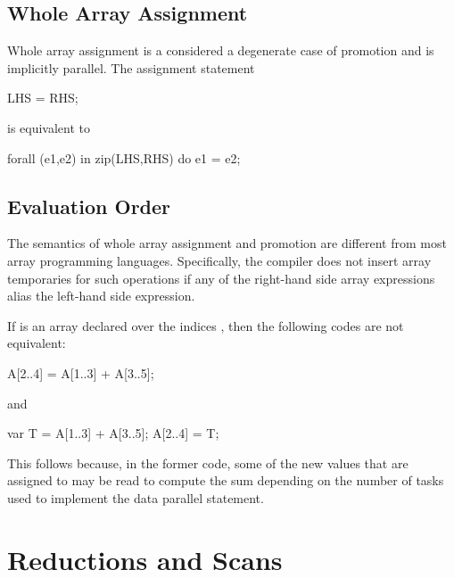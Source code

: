 \subsection{Whole Array Assignment}
\label{Whole_Array_Assignment}

Whole array assignment is a considered a degenerate case of promotion
and is implicitly parallel.  The assignment statement
\begin{chapel}
LHS = RHS;
\end{chapel}
is equivalent to
\begin{chapel}
forall (e1,e2) in zip(LHS,RHS) do
  e1 = e2;
\end{chapel}

\subsection{Evaluation Order}
\label{Evaluation_Order}
The semantics of whole array assignment and promotion are different
from most array programming languages.  Specifically, the compiler
does not insert array temporaries for such operations if any of the
right-hand side array expressions alias the left-hand side expression.

%
%
\begin{example}
If  is an array declared over the indices , then
the following codes are not equivalent:
\begin{chapel}
A[2..4] = A[1..3] + A[3..5];
\end{chapel}
and
\begin{chapel}
var T = A[1..3] + A[3..5];
A[2..4] = T;
\end{chapel}
This follows because, in the former code, some of the new values that
are assigned to  may be read to compute the sum depending on
the number of tasks used to implement the data parallel statement.
\end{example}



\section{Reductions and Scans}
\label{Reductions_and_Scans}

